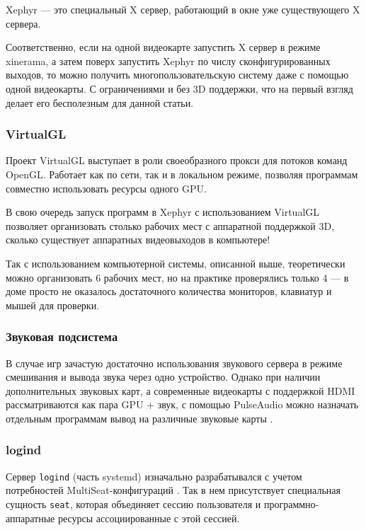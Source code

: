 \documentclass[10pt, a5paper]{article}
\begin{document}
Xephyr \cite{Xephyr} --- это специальный X сервер, работающий в окне уже существующего X сервера.

Соответственно, если на одной видеокарте запустить X сервер в режиме xinerama, а затем поверх
запустить Xephyr по числу сконфигурированных выходов, то можно получить многопользовательскую
систему даже с помощью одной видеокарты. 
С ограничениями и без 3D поддержки, что на первый взгляд делает его бесполезным для данной статьи.

\subsubsection*{VirtualGL}

Проект VirtualGL \cite{VGL} выступает в роли своеобразного прокси для потоков команд OpenGL.
Работает как по сети, так и в локальном режиме, позволяя программам совместно использовать
ресурсы одного GPU.

В свою очередь запуск программ в Xephyr с использованием VirtualGL позволяет организовать 
столько рабочих мест с аппаратной поддержкой 3D, сколько существует аппаратных видеовыходов 
в компьютере!

Так с использованием компьютерной системы, описанной выше, теоретически можно организовать
6 рабочих мест, но на практике проверялись только 4 --- в доме просто не оказалось 
достаточного количества мониторов, клавиатур и мышей для проверки.

\subsubsection*{Звуковая подсистема}

В случае игр зачастую достаточно использования звукового сервера в режиме смешивания и вывода 
звука через одно устройство. Однако при наличии дополнительных звуковых карт, а современные 
видеокарты с поддержкой HDMI рассматриваются как пара GPU + звук, с помощью PulseAudio 
можно назначать отдельным программам вывод на различные звуковые карты \cite{MS2}.

\subsubsection*{logind}

Сервер {\tt logind} (часть systemd) изначально разрабатывался с учетом потребностей MultiSeat-конфигураций 
\cite{MS3}. Так в нем присутствует специальная сущность {\tt seat}, которая объединяет
сессию пользователя и программно-аппаратные ресурсы ассоциированные с этой сессией.
\end{document}

